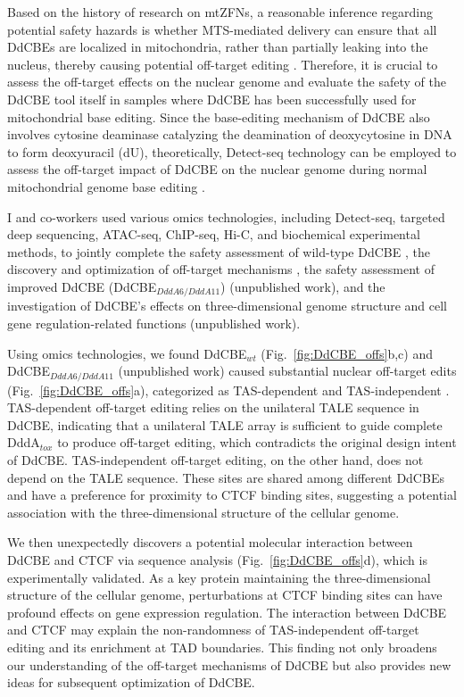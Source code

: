 \documentclass[12pt]{article}
\begin{document}
Based on the history of research on mtZFNs, 
a reasonable inference regarding potential safety hazards is 
whether MTS-mediated delivery can ensure that all DdCBEs are localized in mitochondria, 
rather than partially leaking into the nucleus, thereby causing potential off-target editing \cite{gammage2014mitochondrially}. 
Therefore, it is crucial to assess the off-target effects on the nuclear genome and evaluate 
the safety of the DdCBE tool itself in samples where DdCBE has been successfully used for 
mitochondrial base editing. 
Since the base-editing mechanism of DdCBE also involves cytosine deaminase catalyzing 
the deamination of deoxycytosine in DNA to form deoxyuracil (dU), 
theoretically, Detect-seq technology can be employed to assess the off-target impact 
of DdCBE on the nuclear genome during normal mitochondrial genome base editing \cite{lei2022mitochondrial}.

I and co-workers used various omics technologies,
including Detect-seq, targeted deep sequencing, ATAC-seq, ChIP-seq, Hi-C, 
and biochemical experimental methods, to jointly complete the safety assessment of wild-type DdCBE \cite{lei2022mitochondrial}, 
the discovery and optimization of off-target mechanisms \cite{lei2022mitochondrial}, 
the safety assessment of improved DdCBE (DdCBE$_{DddA6/DddA11}$) (unpublished work), 
and the investigation of DdCBE's effects on three-dimensional 
genome structure and cell gene regulation-related functions (unpublished work).

Using omics technologies,
we found DdCBE$_{wt}$ (Fig.~\ref{fig:DdCBE_offs}b,c) 
and DdCBE$_{DddA6/DddA11}$ (unpublished work) caused substantial nuclear off-target edits (Fig.~\ref{fig:DdCBE_offs}a), 
categorized as TAS-dependent and TAS-independent  \cite{lei2022mitochondrial}. 
TAS-dependent off-target editing relies on the unilateral TALE sequence in DdCBE, 
indicating that a unilateral TALE array is sufficient to guide complete DddA$_{tox}$ to produce off-target editing, 
which contradicts the original design intent of DdCBE. 
TAS-independent off-target editing, on the other hand, does not depend on the TALE sequence. 
These sites are shared among different DdCBEs and have a preference for proximity to CTCF binding sites, 
suggesting a potential association with the three-dimensional structure of the cellular genome.

We then unexpectedly discovers a potential molecular interaction between DdCBE and CTCF 
via sequence analysis (Fig.~\ref{fig:DdCBE_offs}d), 
which is experimentally validated. 
As a key protein maintaining the three-dimensional structure of the cellular genome, 
perturbations at CTCF binding sites can have profound effects on gene expression regulation. 
The interaction between DdCBE and CTCF may explain 
the non-randomness of TAS-independent off-target editing and its enrichment at TAD boundaries. 
This finding not only broadens our understanding of the off-target mechanisms of DdCBE 
but also provides new ideas for subsequent optimization of DdCBE.
\end{document}
